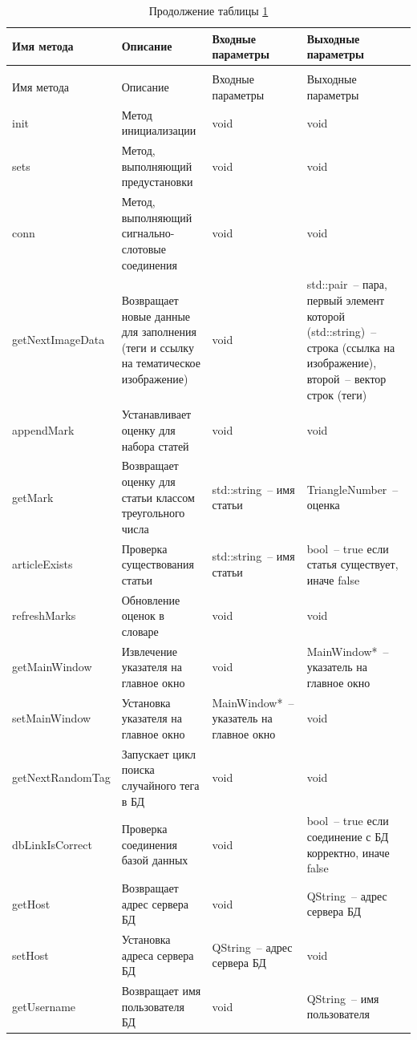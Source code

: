\documentclass[a4paper,14pt,russian]{extreport}
\begin{document}
\begin{longtable}{|m{3 cm}|m{3 cm}|m{4 cm}|m{4 cm}|}
\caption{Методы класса DataModel\label{tab:datamodel}} \\
\hline 
Имя метода & Описание & Входные параметры & Выходные параметры \\
\hline
\endfirsthead
\caption*{Продолжение таблицы \ref{tab:datamodel}} \\
\hline
Имя метода & Описание & Входные параметры & Выходные параметры \\
\endhead
init & Метод инициализации & void & void \\
\hline
sets & Метод, выполняющий предустановки & void & void \\
\hline
conn & Метод, выполняющий сигнально-слотовые соединения & void & void \\
\hline
{getNext\-ImageData} & Возвращает новые данные для заполнения (теги и ссылку на тематическое изображение) & void & std::pair~-- пара, первый элемент которой (std::string)~-- строка (ссылка на изображение), второй~-- вектор строк (теги) \\
\hline
appendMark & Устанавливает оценку для набора статей & void & void \\
\hline
getMark & Возвращает оценку для статьи классом треугольного числа & std::string~-- имя статьи & TriangleNumber~-- оценка \\
\hline
articleExists & Проверка существования статьи & std::string~-- имя статьи & bool~-- true если статья существует, иначе false \\
\hline
refreshMarks & Обновление оценок в словаре & void & void \\
\hline
{getMain\-Window} & Извлечение указателя на главное окно & void & MainWindow*~-- указатель на главное окно \\
\hline
{setMain\-Window} & Установка указателя на главное окно & MainWindow*~-- указатель на главное окно & void \\
\hline
{getNext\-RandomTag} & Запускает цикл поиска случайного тега в БД & void & void \\
\hline
{dbLink\-IsCorrect} & Проверка соединения базой данных & void & bool~-- true если соединение с БД корректно, иначе false \\
\hline
getHost & Возвращает адрес сервера БД & void & QString~-- адрес сервера БД \\
\hline
setHost & Установка адреса сервера БД & QString~-- адрес сервера БД & void \\
\hline
{get\-Username} & Возвращает имя пользователя БД & void & QString~-- имя пользователя \\

\end{longtable}
\end{document}
